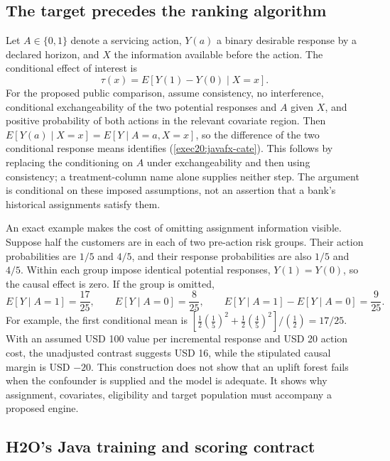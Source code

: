 \subsection{The target precedes the ranking algorithm}
\label{exec20:javafx-target}

Let $A\in\{0,1\}$ denote a servicing action, $Y(a)$ a binary desirable
response by a declared horizon, and $X$ the information available before the
action. The conditional effect of interest is
\begin{equation}
 \tau(x)=E[Y(1)-Y(0)\mid X=x].
 \label{exec20:javafx-cate}
\end{equation}
For the proposed public comparison, assume consistency, no interference,
conditional exchangeability of the two potential responses and $A$ given $X$,
and positive probability of both actions in the relevant covariate region.
Then $E[Y(a)\mid X=x]=E[Y\mid A=a,X=x]$, so the difference of the
two conditional response means identifies (\ref{exec20:javafx-cate}). This
follows by replacing the conditioning on $A$ under exchangeability and then
using consistency; a treatment-column name alone supplies neither step.
The argument is conditional on these imposed assumptions, not an assertion
that a bank's historical assignments satisfy them.
\citep{exec20_javaeffects_reference}

An exact example makes the cost of omitting assignment information visible.
Suppose half the customers are in each of two pre-action risk groups. Their
action probabilities are $1/5$ and $4/5$, and their response probabilities are
also $1/5$ and $4/5$. Within each group impose identical potential responses,
$Y(1)=Y(0)$, so the causal effect is zero. If the group is omitted,
\begin{equation}
 E[Y\mid A=1]=\frac{17}{25},\qquad
 E[Y\mid A=0]=\frac{8}{25},\qquad
 E[Y\mid A=1]-E[Y\mid A=0]=\frac9{25}.
 \label{exec20:javafx-confounding}
\end{equation}
For example, the first conditional mean is
$[\tfrac12(\tfrac15)^2+\tfrac12(\tfrac45)^2]/(\tfrac12)=17/25$.
With an assumed USD 100 value per incremental response and USD 20 action cost,
the unadjusted contrast suggests USD 16, while the stipulated causal margin is
USD $-20$. This construction does not show that an uplift forest fails when
the confounder is supplied and the model is adequate. It shows why assignment,
covariates, eligibility and target population must accompany a proposed engine.
\citep{exec20_javaeffects_reference}

\subsection{H2O's Java training and scoring contract}
\label{exec20:javafx-uplift}


